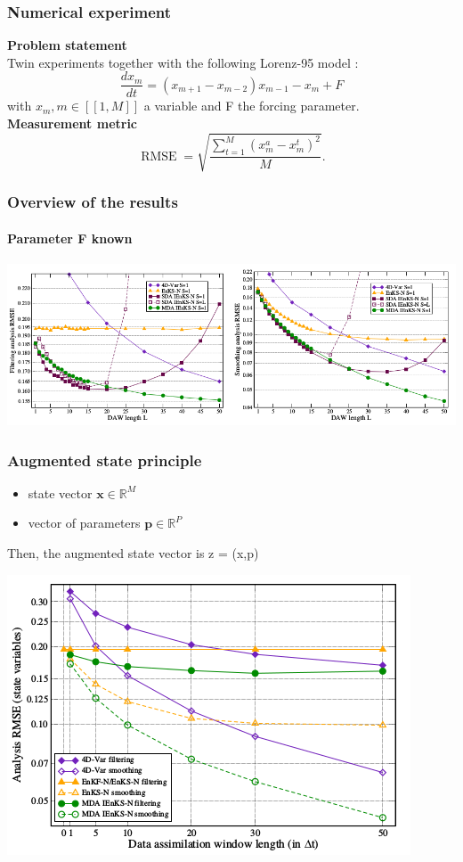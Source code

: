 \documentclass{beamer}
\begin{document}
\begin{frame}
\frametitle{Numerical experiment}
\textbf{Problem statement} \\
Twin experiments together with the following Lorenz-95 model : \\
\begin{equation*}
\frac{dx_m}{dt} = (x_{m+1}-x_{m-2})x_{m-1} - x_m + F
\end{equation*}
with $x_m, m \in [\![1,M]\!]$ a variable and F the forcing parameter. \\

\textbf{Measurement metric}
$$\operatorname{RMSE}= \sqrt{\frac{\sum_{t=1}^M (x_{m}^{a} - x_{m}^{t})^2}{M}}.$$
\end{frame}
\begin{frame}
\frametitle{Overview of the results}
\framesubtitle{Parameter F known}
\includegraphics[width=\paperwidth,height=\paperheight]{../Image/IEnKS_weak.png}

\end{frame}

\begin{frame}
\frametitle{Augmented state principle}
\begin{itemize}
\item state vector $\textbf{x} \in \mathbb{R}^M$
\item vector of parameters $\textbf{p} \in \mathbb{R}^P$
\end{itemize}

Then, the augmented state vector is z = (x,p) 
\begin{center}
\includegraphics[scale=0.5]{../Image/IEnKS_forcing.png}
\end{center}
\end{frame}
\end{document}

